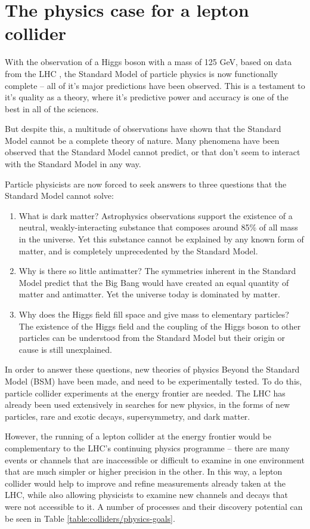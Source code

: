 \section{The physics case for a lepton collider}
With the observation of a Higgs boson with a mass of 125 GeV, based on data from the \acrlong{LHC} \cite{higgs-atlas} \cite{higgs-cms}, the Standard Model of particle physics is now functionally complete -- all of it's major predictions have been observed. This is a testament to it's quality as a theory, where it's predictive power and accuracy is one of the best in all of the sciences.

But despite this, a multitude of observations have shown that the Standard Model cannot be a complete theory of nature. Many phenomena have been observed that the Standard Model cannot predict, or that don't seem to interact with the Standard Model in any way.

Particle physicists are now forced to seek answers to three questions that the Standard Model cannot solve:

\begin{enumerate}
	\item What is dark matter? Astrophysics observations support the existence of a neutral, weakly-interacting substance that composes around 85\% of all mass in the universe. Yet this substance cannot be explained by any known form of matter, and is completely unprecedented by the Standard Model.
	\item Why is there so little antimatter? The symmetries inherent in the Standard Model predict that the Big Bang would have created an equal quantity of matter and antimatter. Yet the universe today is dominated by matter.
	\item Why does the Higgs field fill space and give mass to elementary particles? The existence of the Higgs field and the coupling of the Higgs boson to other particles can be understood from the Standard Model but their origin or cause is still unexplained.
\end{enumerate}

In order to answer these questions, new theories of physics Beyond the Standard Model (\acrshort{BSM}) have been made, and need to be experimentally tested. To do this, particle collider experiments at the energy frontier are needed. The \acrfull{LHC} has already been used extensively in searches for new physics, in the forms of new particles, rare and exotic decays, supersymmetry, and dark matter.

However, the running of a lepton collider at the energy frontier would be complementary to the \acrshort{LHC}'s continuing physics programme -- there are many events or channels that are inaccessible or difficult to examine in one environment that are much simpler or higher precision in the other. In this way, a lepton collider would help to improve and refine measurements already taken at the \acrshort{LHC}, while also allowing physicists to examine new channels and decays that were not accessible to it. A number of processes and their discovery potential can be seen in Table \ref{table:colliders/physics-goals}.


